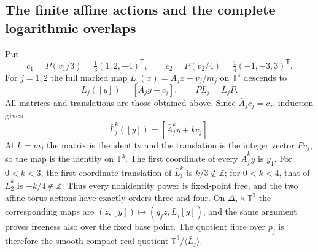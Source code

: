 \subsection{The finite affine actions and the complete logarithmic overlaps}

Put
\begin{equation}
 c_1=P(v_1/3)=\tfrac13(1,2,-4)^{\mathsf T},\qquad
 c_2=P(v_2/4)=\tfrac14(-1,-3,3)^{\mathsf T}.
 \label{s6q:finite-directions}
\end{equation}
For $j=1,2$ the full marked map
$L_j(x)=A_jx+v_j/m_j$ on $\mathbb T^4$ descends to
\[
 \bar L_j([y])=[\bar A_jy+c_j],\qquad
 \overline P L_j=\bar L_j\overline P.
\]
All matrices and translations are those obtained above. Since
$\bar A_jc_j=c_j$, induction gives
\begin{equation}
 \bar L_j^{k}([y])=[\bar A_j^{k}y+kc_j].
 \label{s6q:affine-powers}
\end{equation}
At $k=m_j$ the matrix is the identity and the translation is the integer
vector $Pv_j$, so the map is the identity on $\mathbb T^3$.
The first coordinate of every $\bar A_j^{k}y$ is $y_1$.
For $0<k<3$, the first-coordinate translation of $\bar L_1^{k}$ is
$k/3\notin\mathbb Z$; for $0<k<4$, that of $\bar L_2^{k}$ is
$-k/4\notin\mathbb Z$. Thus every nonidentity power is fixed-point free,
and the two affine torus actions have exactly orders three and four.
On $\Delta_j\times\mathbb T^3$ the corresponding maps are
$(z,[y])\mapsto(g_jz,\bar L_j[y])$, and the same argument proves freeness
also over the fixed base point. The quotient fibre over $p_j$ is therefore
the smooth compact real quotient $\mathbb T^3/\langle\bar L_j\rangle$.

